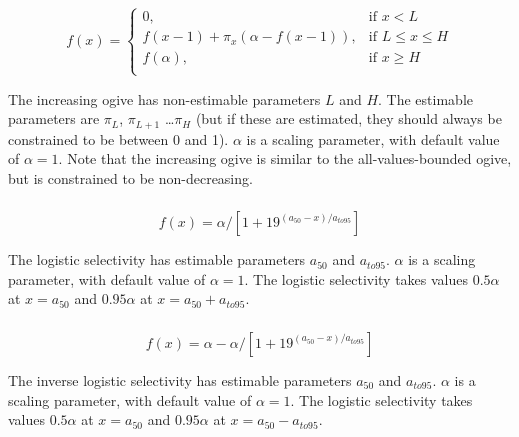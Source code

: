 \subsubsection[Increasing]{}

\begin{equation} 
f(x)=\begin{cases}
	  0, & \text{if $x < L$} \\
	  f(x-1)+ \pi_x(\alpha-f(x-1)), & \text{if $L \le x \le H$} \\
	  f(\alpha), & \text{if $x \ge H$} \\  
  \end{cases}
\end{equation}

The increasing ogive has non-estimable parameters $L$ and $H$. The estimable parameters are $\pi_L$, $\pi_{L+1}$ \ldots $\pi_H$ (but if these are estimated, they should always be constrained to be between 0 and 1). $\alpha$ is a scaling parameter, with default value of $\alpha = 1$. Note that the increasing ogive is similar to the all-values-bounded ogive, but is constrained to be non-decreasing.

\subsubsection[Logistic]{}

\begin{equation}
  f(x) = \alpha / [1+19^{(a_{50}-x)/a_{to95}}]
\end{equation}
 
The logistic selectivity has estimable parameters $a_{50}$ and $a_{to95}$. $\alpha$ is a scaling parameter, with default value of $\alpha = 1$. The logistic selectivity takes values $0.5 \alpha$ at $x=a_{50}$ and $0.95 \alpha$ at $x=a_{50}+a_{to95}$. 

\subsubsection[Inverse logistic]{}

\begin{equation}
  f(x) = \alpha - \alpha / [1+19^{(a_{50}-x)/a_{to95}}]
\end{equation}
 
The inverse logistic selectivity has estimable parameters $a_{50}$ and $a_{to95}$. $\alpha$ is a scaling parameter, with default value of $\alpha = 1$. The logistic selectivity takes values $0.5 \alpha$ at $x=a_{50}$ and $0.95 \alpha$ at $x=a_{50}-a_{to95}$. 

